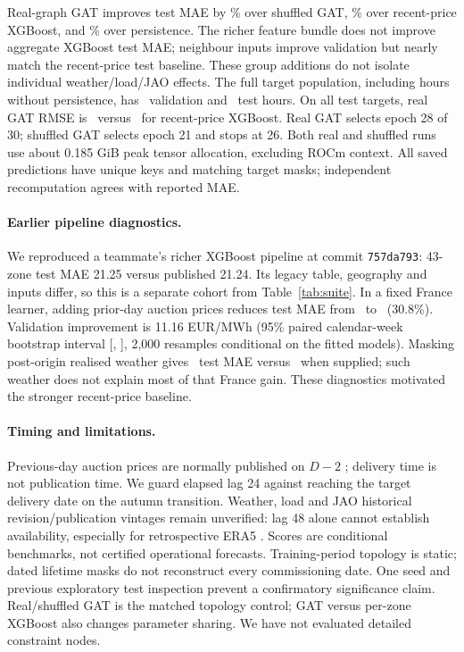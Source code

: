 \documentclass{article}
\begin{document}
Real-graph GAT improves test MAE by \SuiteShuffleGain\% over shuffled GAT,
\SuiteXgbGain\% over recent-price XGBoost, and \SuitePersistenceGain\% over
persistence. The richer feature bundle does not improve aggregate XGBoost test
MAE; neighbour inputs improve validation but nearly match the recent-price test
baseline. These group additions do not isolate individual weather/load/JAO effects.
The full target population, including hours without persistence, has
\SuiteAllValHours\ validation and \SuiteAllTestHours\ test hours. On all test
targets, real GAT RMSE is \SuiteGraphRmse\ versus \SuiteRecentRmse\ for recent-price
XGBoost. Real GAT selects epoch 28 of 30; shuffled GAT selects epoch 21 and
stops at 26. Both real and shuffled runs use about 0.185 GiB peak tensor allocation,
excluding ROCm context. All saved predictions have unique keys and matching target
masks; independent recomputation agrees with reported MAE.

\paragraph{Earlier pipeline diagnostics.}
We reproduced a teammate's richer XGBoost pipeline at commit \texttt{757da793}:
43-zone test MAE 21.25 versus published 21.24. Its legacy table, geography and
inputs differ, so this is a separate cohort from Table~\ref{tab:suite}. In a fixed
France learner, adding prior-day auction prices reduces test MAE from
\WeeklyCalendarTest\ to \RecentPriceTest\ (30.8\%). Validation improvement is
11.16 EUR/MWh (95\% paired calendar-week bootstrap interval
[\PriceBootstrapLower, \PriceBootstrapUpper], 2,000 resamples conditional on the
fitted models). Masking post-origin realised weather gives \PastWeatherTest\ test
MAE versus \AllWeatherTest\ when supplied; such weather does not explain most
of that France gain. These diagnostics motivated the stronger recent-price baseline.

\paragraph{Timing and limitations.}
Previous-day auction prices are normally published on $D-2$ \cite{auction};
delivery time is not publication time. We guard elapsed lag 24 against reaching
the target delivery date on the autumn transition. Weather, load and JAO historical
revision/publication vintages remain unverified: lag 48 alone cannot establish
availability, especially for retrospective ERA5 \cite{era5}. Scores are conditional
benchmarks, not certified operational forecasts. Training-period topology is static;
dated lifetime masks do not reconstruct every commissioning date. One seed and
previous exploratory test inspection prevent a confirmatory significance claim.
Real/shuffled GAT is the matched topology control; GAT versus per-zone XGBoost
also changes parameter sharing. We have not evaluated detailed constraint nodes.
\end{document}
